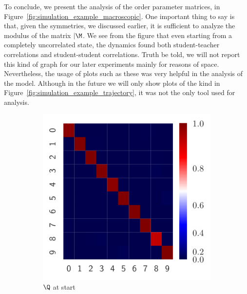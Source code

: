 To conclude, we present the analysis of the order parameter matrices, in Figure~\ref{fig:simulation_example_macroscopic}.
One important thing to say is that, given the symmetries, we discussed earlier,
it is sufficient to analyze the modulus of the matrix \(|\M\). 
We see from the figure that even starting from a completely uncorrelated state,
the dynamics found both student-teacher correlations and student-student correlations.
Truth be told, we will not report this kind of graph for our later experiments mainly for reasons of space.
Nevertheless, the usage of plots such as these was very helpful in the analysis of the model.
Although in the future we will only show plots of the kind in Figure~\ref{fig:simulation_example_trajectory},
it was not the only tool used for analysis.
\begin{figure}
  \centering
  \begin{subfigure}{0.495\textwidth}
    \includegraphics[width=1.\textwidth]{figures/simulation_examples_Q_start.pdf}
    \caption{\(\Q\) at start}
  \end{subfigure}
  \begin{subfigure}{0.495\textwidth}

\end{subfigure}
\end{figure}
